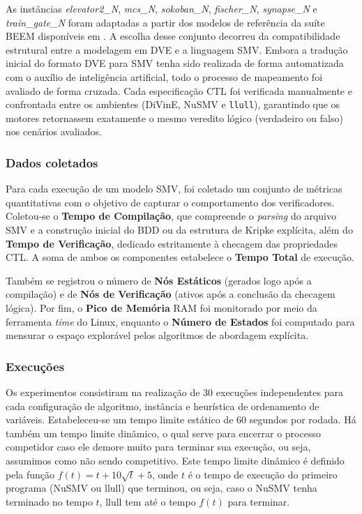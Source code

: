 \documentclass[cic,tc]{infufrgs}
\begin{document}
	As instâncias \textit{elevator2\_N}, \textit{mcs\_N}, \textit{sokoban\_N}, \textit{fischer\_N}, \textit{synapse\_N} e \textit{train\_gate\_N} foram adaptadas a partir dos modelos de referência da suíte BEEM disponíveis em . A escolha desse conjunto decorreu da compatibilidade estrutural entre a modelagem em DVE e a linguagem SMV.
	Embora a tradução inicial do formato DVE para SMV tenha sido realizada de forma automatizada com o auxílio de inteligência artificial, todo o processo de mapeamento foi avaliado de forma cruzada. 
	Cada especificação CTL foi verificada manualmente e confrontada entre os ambientes (DiVinE, NuSMV e \texttt{llull}), garantindo que os motores retornassem exatamente o mesmo veredito lógico (verdadeiro ou falso) nos cenários avaliados.
	
	\subsubsection{Dados coletados}
	
	Para cada execução de um modelo SMV, foi coletado um conjunto de métricas quantitativas com o objetivo de capturar o comportamento dos verificadores. Coletou-se o \textbf{Tempo de Compilação}, que compreende o \textit{parsing} do arquivo SMV e a construção inicial do BDD ou da estrutura de Kripke explícita, além do \textbf{Tempo de Verificação}, dedicado estritamente à checagem das propriedades CTL. A soma de ambos os componentes estabelece o \textbf{Tempo Total} de execução. 
	
	Também se registrou o número de \textbf{Nós Estáticos} (gerados logo após a compilação) e de \textbf{Nós de Verificação} (ativos após a conclusão da checagem lógica). Por fim, o \textbf{Pico de Memória} RAM foi monitorado por meio da ferramenta \textit{time} do Linux, enquanto o \textbf{Número de Estados} foi computado para mensurar o espaço explorável pelos algoritmos de abordagem explícita.
	
	\subsubsection{Execuções}
	
	Os experimentos consistiram na realização de 30 execuções independentes para cada configuração de algoritmo, instância e heurística de ordenamento de variáveis. Estabeleceu-se um tempo limite estático de 60 segundos por rodada. 
	Há também um tempo limite dinâmico, o qual serve para encerrar o processo competidor caso ele demore muito para terminar sua execução, ou seja, assumimos como não sendo competitivo.
	Este tempo limite dinâmico é definido pela função $f(t) = t + 10\sqrt{t}+5$, onde $t$ é o tempo de execução do primeiro programa (NuSMV ou llull) que terminou, ou seja, caso o NuSMV tenha terminado no tempo $t$, llull tem até o tempo $f(t)$ para terminar.
	
\end{document}
